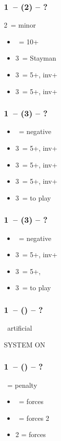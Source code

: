 \documentclass[12pt, a4paper]{article}
\begin{document}
\subsubsection*{1\nt\ -- (2\nt\alrts) -- ?}
2\nt\ = minor
\begin{itemize}
    \item \dbl\ = 10+
    \item 3\clubs\ = Stayman
    \item 3\diams\ = 5+\hearts, inv+
    \item 3\hearts\ = 5+\spades, inv+
\end{itemize}

\subsubsection*{1\nt\ -- (3\clubs) -- ?}
\begin{itemize}
    \item \dbl\ = negative
    \item 3\diams\ = 5+\hearts, inv+
    \item 3\hearts\ = 5+\spades, inv+
    \item 3\spades\ = 5+\diams, inv+
    \item 3\nt\ = to play
\end{itemize}

\subsubsection*{1\nt\ -- (3\diams) -- ?}
\begin{itemize}
    \item \dbl\ = negative
    \item 3\hearts\ = 5+\spades, inv+
    \item 3\spades\ = 5+\hearts, \gf
    \item 3\nt\ = to play
\end{itemize}

\subsubsection*{1\nt\ -- (\dbl\alrts) -- ?}
\dbl\ artificial

SYSTEM ON


\subsubsection*{1\nt\ -- (\dbl) -- ?}
\dbl\ = penalty
\begin{itemize}
    \item \pass\ = forces \rdbl
    \item \rdbl\ = forces 2\clubs
    \item 2 = forces 
\end{itemize}
\end{document}
